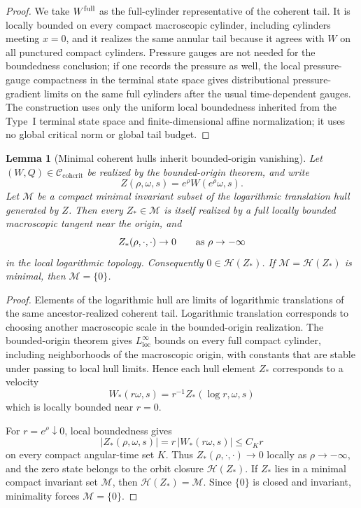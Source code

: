 \documentclass[11pt]{amsart}
\numberwithin{equation}{section}
\theoremstyle{plain}
\newtheorem{lemma}[theorem]{Lemma}
\theoremstyle{definition}
\theoremstyle{remark}
\newcommand{\loc}{\mathrm{loc}}
\newcommand{\Ccohcrit}{\mathcal C_{\mathrm{cohcrit}}}
\begin{document}
\begin{proof}
We take \(W^{\rm full}\) as the full-cylinder representative of the coherent
tail.  It is locally bounded on every compact macroscopic cylinder, including
cylinders meeting \(x=0\), and it realizes the same annular tail because it
agrees with \(W\) on all punctured compact cylinders.  Pressure gauges are not
needed for the boundedness conclusion; if one records the pressure as well, the
local pressure-gauge compactness in the terminal state space gives
distributional pressure-gradient limits on the same full cylinders after the
usual time-dependent gauges.  The construction uses only the uniform local
boundedness inherited from the Type~I terminal state space and finite-dimensional
affine normalization; it uses no global critical norm or global tail budget.
\end{proof}

\begin{lemma}[Minimal coherent hulls inherit bounded-origin vanishing]
\label{lem:minimal-coherent-hull-origin-vanishing}
Let \((W,Q)\in\Ccohcrit\) be realized by the bounded-origin theorem, and write
\[
   Z(\rho,\omega,s)=e^\rho W(e^\rho\omega,s).
\]
Let \(\mathcal M\) be a compact minimal invariant subset of the logarithmic
translation hull generated by \(Z\).  Then every \(Z_*\in\mathcal M\) is itself
realized by a full locally bounded macroscopic tangent near the origin, and
\[
   Z_*(\rho,\cdot,\cdot)\to0
   \qquad\hbox{as }\rho\to-\infty
\]
in the local logarithmic topology.  Consequently \(0\in\mathcal H(Z_*)\).  If
\(\mathcal M=\mathcal H(Z_*)\) is minimal, then \(\mathcal M=\{0\}\).
\end{lemma}

\begin{proof}
Elements of the logarithmic hull are limits of logarithmic translations of the
same ancestor-realized coherent tail.  Logarithmic translation corresponds to
choosing another macroscopic scale in the bounded-origin realization.  The
bounded-origin theorem gives \(L^\infty_{\loc}\) bounds on every full compact
cylinder, including neighborhoods of the macroscopic origin, with constants
that are stable under passing to local hull limits.  Hence each hull element
\(Z_*\) corresponds to a velocity
\[
   W_*(r\omega,s)=r^{-1}Z_*(\log r,\omega,s)
\]
which is locally bounded near \(r=0\).

For \(r=e^\rho\downarrow0\), local boundedness gives
\[
   |Z_*(\rho,\omega,s)|
   =
   r\,|W_*(r\omega,s)|
   \le C_K r
\]
on every compact angular-time set \(K\).  Thus
\(Z_*(\rho,\cdot,\cdot)\to0\) locally as \(\rho\to-\infty\), and the zero state
belongs to the orbit closure \(\mathcal H(Z_*)\).  If \(Z_*\) lies in a minimal
compact invariant set \(\mathcal M\), then \(\mathcal H(Z_*)=\mathcal M\).
Since \(\{0\}\) is closed and invariant, minimality forces
\(\mathcal M=\{0\}\).
\end{proof}
\end{document}
